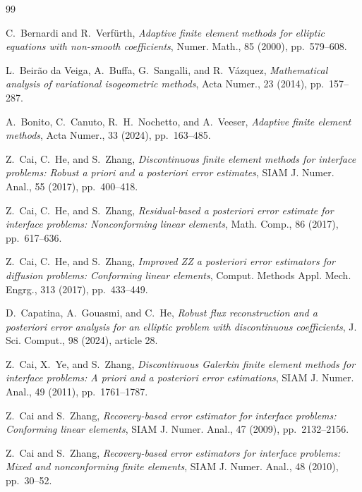 \documentclass[10pt,pdftex]{amsart}%
\numberwithin{equation}{section}
\begin{document}
\begin{thebibliography}{99}

C.~Bernardi and R.~Verf\"urth,
\newblock \emph{Adaptive finite element methods for elliptic equations with non-smooth coefficients},
\newblock Numer. Math., 85 (2000), pp.~579--608.

L.~Beir\~ao da Veiga, A.~Buffa, G.~Sangalli, and R.~V\'azquez,
\newblock \emph{Mathematical analysis of variational isogeometric methods},
\newblock Acta Numer., 23 (2014), pp.~157--287.

A.~Bonito, C.~Canuto, R.~H.~Nochetto, and A.~Veeser,
\newblock \emph{Adaptive finite element methods},
\newblock Acta Numer., 33 (2024), pp.~163--485.

Z.~Cai, C.~He, and S.~Zhang,
\newblock \emph{Discontinuous finite element methods for interface problems: Robust a priori and a posteriori error estimates},
\newblock SIAM J. Numer. Anal., 55 (2017), pp.~400--418.

Z.~Cai, C.~He, and S.~Zhang,
\newblock \emph{Residual-based a posteriori error estimate for interface problems: Nonconforming linear elements},
\newblock Math. Comp., 86 (2017), pp.~617--636.

Z.~Cai, C.~He, and S.~Zhang,
\newblock \emph{Improved ZZ a posteriori error estimators for diffusion problems: Conforming linear elements},
\newblock Comput. Methods Appl. Mech. Engrg., 313 (2017), pp.~433--449.

D.~Capatina, A.~Gouasmi, and C.~He,
\newblock \emph{Robust flux reconstruction and a posteriori error analysis for an elliptic problem with discontinuous coefficients},
\newblock J. Sci. Comput., 98 (2024), article 28.

Z.~Cai, X.~Ye, and S.~Zhang,
\newblock \emph{Discontinuous Galerkin finite element methods for interface problems: A priori and a posteriori error estimations},
\newblock SIAM J. Numer. Anal., 49 (2011), pp.~1761--1787.

Z.~Cai and S.~Zhang,
\newblock \emph{Recovery-based error estimator for interface problems: Conforming linear elements},
\newblock SIAM J. Numer. Anal., 47 (2009), pp.~2132--2156.

Z.~Cai and S.~Zhang,
\newblock \emph{Recovery-based error estimators for interface problems: Mixed and nonconforming finite elements},
\newblock SIAM J. Numer. Anal., 48 (2010), pp.~30--52.


\end{thebibliography}
\end{document}
